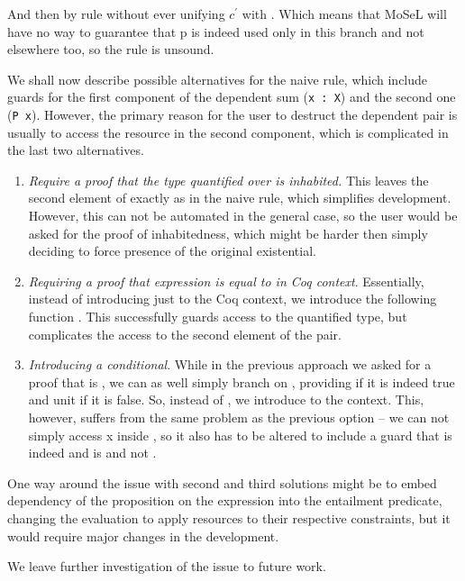 And then by  rule without ever unifying $c^{'}$ with \true.
Which means that MoSeL will have no way to guarantee that p is indeed used only in this branch and not elsewhere too, so the rule is unsound.

We shall now describe possible alternatives for the naive rule, which include guards for the first component of the dependent sum (\texttt{x : X}) and the second one (\texttt{P x}).
However, the primary reason for the user to destruct the dependent pair is usually to access the resource in the second component, which is complicated in the last two alternatives.
\begin{enumerate}
\item \emph{Require a proof that the type quantified over is inhabited.}
  This leaves the second element of exactly as in the naive rule, which simplifies development.
  However, this can not be automated in the general case, so the user would be asked for the proof of inhabitedness, which might be harder then simply deciding to force presence of the original existential.
\item \emph{Requiring a proof that expression is equal to \true in Coq context}.
  Essentially, instead of introducing just  to the Coq context, we introduce the following function .
  This successfully guards access to the quantified type, but complicates the access to the second element of the pair.
\item \emph{Introducing a conditional}.
  While in the previous approach we asked for a proof that  is \true, we can as well simply branch on , providing  if it is indeed true and unit if it is false.
  So, instead of , we introduce  to the context.
  This, however, suffers from the same problem as the previous option -- we can not simply access x inside , so it also has to be altered to include a guard that  is indeed \true and  is  and not .
\end{enumerate}

One way around the issue with second and third solutions might be to embed dependency of the proposition on the expression into the entailment predicate, changing the evaluation to apply resources to their respective constraints, but it would require major changes in the development.

We leave further investigation of the issue to future work.



